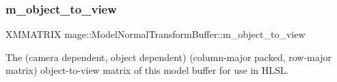 \subsubsection{\texorpdfstring{m\+\_\+object\+\_\+to\+\_\+view}{m\_object\_to\_view}}
{\footnotesize\ttfamily X\+M\+M\+A\+T\+R\+IX mage\+::\+Model\+Normal\+Transform\+Buffer\+::m\+\_\+object\+\_\+to\+\_\+view}

The (camera dependent, object dependent) (column-\/major packed, row-\/major matrix) object-\/to-\/view matrix of this model buffer for use in H\+L\+SL. 